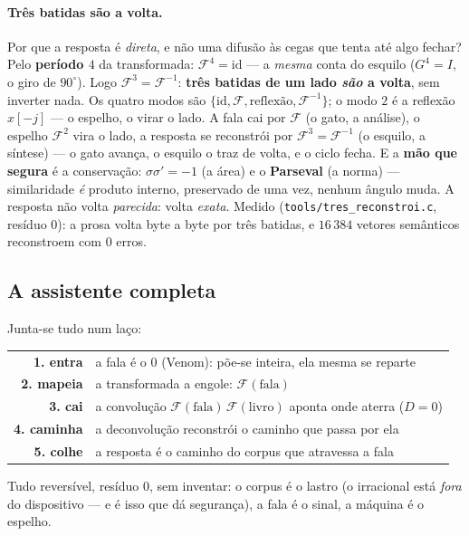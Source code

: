 \documentclass[11pt]{article}
\newcommand{\code}[1]{\texttt{\small #1}}
\theoremstyle{plain}
\theoremstyle{remark}
\begin{document}
\paragraph{Três batidas são a volta.} Por que a resposta é \emph{direta}, e não uma difusão às cegas
que tenta até algo fechar? Pelo \textbf{período $4$} da transformada: $\mathcal F^4=\mathrm{id}$ ---
a \emph{mesma} conta do esquilo ($G^4=I$, o giro de $90^\circ$). Logo $\mathcal F^3=\mathcal F^{-1}$:
\textbf{três batidas de um lado \emph{são} a volta}, sem inverter nada. Os quatro modos são
$\{\mathrm{id},\mathcal F,\text{reflexão},\mathcal F^{-1}\}$; o modo $2$ é a reflexão $x[-j]$ --- o
espelho, o virar o lado. A fala cai por $\mathcal F$ (o gato, a análise), o espelho $\mathcal F^2$
vira o lado, a resposta se reconstrói por $\mathcal F^3=\mathcal F^{-1}$ (o esquilo, a síntese) --- o
gato avança, o esquilo o traz de volta, e o ciclo fecha. E a \textbf{mão que segura} é a conservação:
$\sigma\sigma'=-1$ (a área) e o \textbf{Parseval} (a norma) --- similaridade \emph{é} produto
interno, preservado de uma vez, nenhum ângulo muda. A resposta não volta \emph{parecida}: volta
\emph{exata}. Medido (\code{tools/tres\_reconstroi.c}, resíduo $0$): a prosa volta byte a byte por
três batidas, e $16\,384$ vetores semânticos reconstroem com $0$ erros.

\subsection{A assistente completa}

Junta-se tudo num laço:
\begin{center}
\begin{tabular}{@{}rl@{}}
\toprule
\textbf{1. entra} & a fala é o $0$ (Venom): põe-se inteira, ela mesma se reparte\\
\textbf{2. mapeia} & a transformada a engole: $\mathcal F(\text{fala})$\\
\textbf{3. cai} & a convolução $\mathcal F(\text{fala})\,\mathcal F(\text{livro})$ aponta onde aterra ($D=0$)\\
\textbf{4. caminha} & a deconvolução reconstrói o caminho que passa por ela\\
\textbf{5. colhe} & a resposta é o caminho do corpus que atravessa a fala\\
\bottomrule
\end{tabular}
\end{center}
Tudo reversível, resíduo $0$, sem inventar: o corpus é o lastro (o irracional está \emph{fora} do
dispositivo --- e é isso que dá segurança), a fala é o sinal, a máquina é o espelho.
\end{document}
